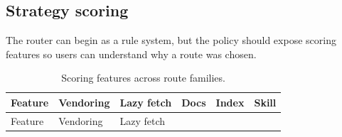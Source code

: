 \documentclass[
  11pt,
  letterpaper,
  numbers=noendperiod,
  parskip=half]{scrartcl}
\begin{document}
\figureRouterArchitecture

\subsection{Strategy scoring}\label{sec-strategy-scoring}

The router can begin as a rule system, but the policy should expose
scoring features so users can understand why a route was chosen.

\begin{longtable}[]{@{}
  >{\raggedright\arraybackslash}p{}
  >{\raggedright\arraybackslash}p{}
  >{\raggedright\arraybackslash}p{}
  >{\raggedright\arraybackslash}p{}
  >{\raggedright\arraybackslash}p{}
  >{\raggedright\arraybackslash}p{}@{}}
\caption{Scoring features across route
families.}\label{tbl-scoring}\tabularnewline
\toprule\noalign{}
\begin{minipage}[b]{\linewidth}\raggedright
Feature
\end{minipage} & \begin{minipage}[b]{\linewidth}\raggedright
Vendoring
\end{minipage} & \begin{minipage}[b]{\linewidth}\raggedright
Lazy fetch
\end{minipage} & \begin{minipage}[b]{\linewidth}\raggedright
Docs
\end{minipage} & \begin{minipage}[b]{\linewidth}\raggedright
Index
\end{minipage} & \begin{minipage}[b]{\linewidth}\raggedright
Skill
\end{minipage} \\
\midrule\noalign{}
\endfirsthead
\toprule\noalign{}
\begin{minipage}[b]{\linewidth}\raggedright
Feature
\end{minipage} & \begin{minipage}[b]{\linewidth}\raggedright
Vendoring
\end{minipage} & \begin{minipage}[b]{\linewidth}\raggedright
Lazy fetch
\end{minipage} & \begin{minipage}[b]{\linewidth}\raggedright

\end{minipage}
\end{longtable}
\end{document}

